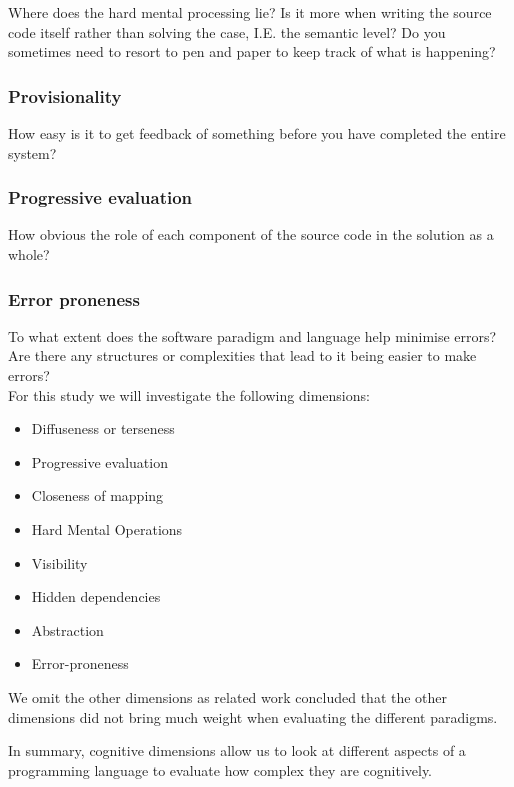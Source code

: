 \documentclass[12pt]{report}
\theoremstyle{definition}
\theoremstyle{theorem}
\begin{document}
Where does the hard mental processing lie? Is it more when writing the source
code itself rather than solving the case, I.E. the semantic level? Do you
sometimes need to resort to pen and paper to keep track of what is happening?

\subsubsection*{Provisionality}

How easy is it to get feedback of something before you have completed the entire
system?

\subsubsection*{Progressive evaluation}

How obvious the role of each component of the source code in the solution as a
whole?

\subsubsection*{Error proneness}

To what extent does the software paradigm and language help minimise errors? Are
there any structures or complexities that lead to it being easier to make
errors?~\cite{GREEN1996131}\\

\noindent For this study we will investigate the following dimensions: 

\begin{itemize}
    \item Diffuseness or terseness
    \item Progressive evaluation
    \item Closeness of mapping
    \item Hard Mental Operations
    \item Visibility
    \item Hidden dependencies
    \item Abstraction
    \item Error-proneness 
\end{itemize}

\noindent We omit the other dimensions as related work concluded that the other
dimensions did not bring much weight when evaluating the different
paradigms.~\cite{euguenkiss}

In summary, cognitive dimensions allow us to look at different aspects of a
programming language to evaluate how complex they are cognitively. 
\end{document}
